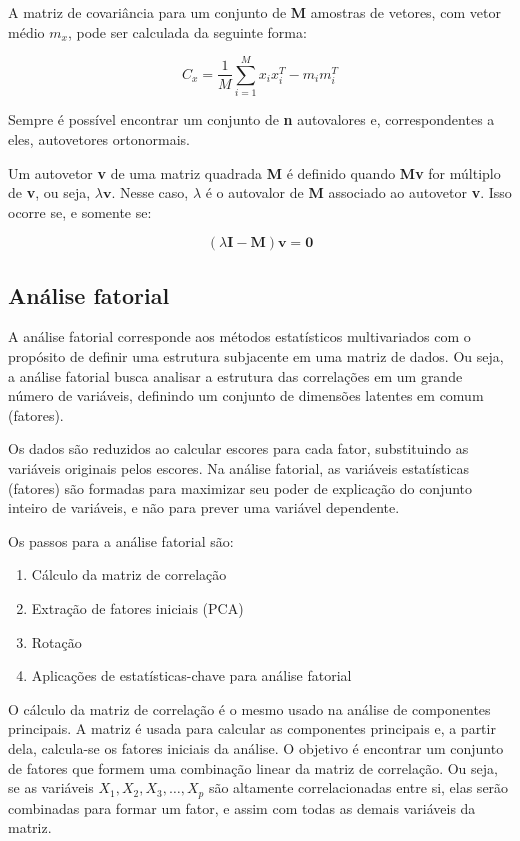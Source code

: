 \documentclass[
  portuguese,
]{estat/estat}
\providecommand{\tightlist}{%
  \setlength{\itemsep}{0pt}\setlength{\parskip}{0pt}}
\begin{document}
A matriz de covariância para um conjunto de \textbf{M} amostras de
vetores, com vetor médio \(m_{x}\), pode ser calculada da seguinte
forma:

\[
C_{x} = \frac{1}{M} \sum_{i=1}^{M} x_{i} x_{i}^{T} - m_{i} m_{i}^{T}
\]

Sempre é possível encontrar um conjunto de \textbf{n} autovalores e,
correspondentes a eles, autovetores ortonormais.

Um autovetor \textbf{v} de uma matriz quadrada \textbf{M} é definido
quando \textbf{Mv} for múltiplo de \textbf{v}, ou seja,
\(\lambda \mathbf{v}\). Nesse caso, \(\lambda\) é o autovalor de
\textbf{M} associado ao autovetor \textbf{v}. Isso ocorre se, e somente
se:

\[
(\lambda \mathbf{I} - \mathbf{M})\mathbf{v} = \mathbf{0}
\]

\subsection{Análise fatorial}\label{anuxe1lise-fatorial}

A análise fatorial corresponde aos métodos estatísticos multivariados
com o propósito de definir uma estrutura subjacente em uma matriz de
dados. Ou seja, a análise fatorial busca analisar a estrutura das
correlações em um grande número de variáveis, definindo um conjunto de
dimensões latentes em comum (fatores).

Os dados são reduzidos ao calcular escores para cada fator, substituindo
as variáveis originais pelos escores. Na análise fatorial, as variáveis
estatísticas (fatores) são formadas para maximizar seu poder de
explicação do conjunto inteiro de variáveis, e não para prever uma
variável dependente.

Os passos para a análise fatorial são:

\begin{enumerate}
\def\labelenumi{\arabic{enumi}.}
\tightlist
\item
  Cálculo da matriz de correlação
\item
  Extração de fatores iniciais (PCA)
\item
  Rotação
\item
  Aplicações de estatísticas-chave para análise fatorial
\end{enumerate}

O cálculo da matriz de correlação é o mesmo usado na análise de
componentes principais. A matriz é usada para calcular as componentes
principais e, a partir dela, calcula-se os fatores iniciais da análise.
O objetivo é encontrar um conjunto de fatores que formem uma combinação
linear da matriz de correlação. Ou seja, se as variáveis
\(X_1, X_2, X_3, \ldots, X_p\) são altamente correlacionadas entre si,
elas serão combinadas para formar um fator, e assim com todas as demais
variáveis da matriz.
\end{document}
